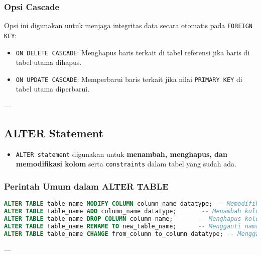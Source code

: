 \documentclass{article}
\begin{document}
\subsubsection{Opsi Cascade}
Opsi ini digunakan untuk menjaga integritas data secara otomatis pada \texttt{FOREIGN KEY}:
\begin{itemize}
    \item \texttt{ON DELETE CASCADE}: Menghapus baris terkait di tabel referensi jika baris di tabel utama dihapus.
    \item \texttt{ON UPDATE CASCADE}: Memperbarui baris terkait jika nilai \texttt{PRIMARY KEY} di tabel utama diperbarui.
\end{itemize}

---

\subsection{ALTER Statement}
\begin{itemize}
    \item \texttt{ALTER statement} digunakan untuk \textbf{menambah, menghapus, dan memodifikasi kolom} serta \texttt{constraints} dalam tabel yang sudah ada.
\end{itemize}

\subsubsection{Perintah Umum dalam ALTER TABLE}
\begin{lstlisting}[language=SQL, caption={Perintah ALTER TABLE}, captionpos=b]
ALTER TABLE table_name MODIFY COLUMN column_name datatype; -- Memodifikasi kolom
ALTER TABLE table_name ADD column_name datatype;       -- Menambah kolom baru
ALTER TABLE table_name DROP COLUMN column_name;       -- Menghapus kolom
ALTER TABLE table_name RENAME TO new_table_name;      -- Mengganti nama tabel
ALTER TABLE table_name CHANGE from_column to_column datatype; -- Mengganti nama kolom/field
\end{lstlisting}

---
\end{document}
